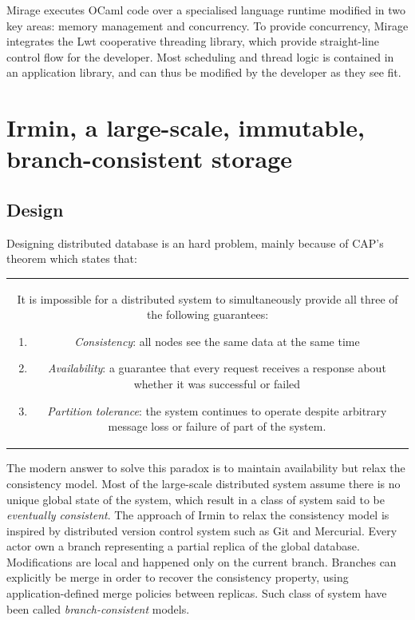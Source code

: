 \documentclass{article}
\renewcommand{\-}{\hyp}
\newcommand{\irmin}{Irmin\xspace}
\newcommand{\git}{Git\xspace}
\newcommand{\lwt}{Lwt\xspace}
\newcommand{\mercurial}{Mercurial\xspace}
\newcommand{\mirage}{Mirage\xspace}
\newcommand{\ocaml}{OCaml\xspace}
\begin{document}
\mirage executes \ocaml code over a specialised language runtime modified in two key areas: memory management and concurrency.
To provide concurrency, \mirage integrates the \lwt cooperative threading library, which provide straight-line control flow for the developer.
Most scheduling and thread logic is contained in an application library, and can thus be modified by the developer as they see fit\cite{LibraryOperatingSystemsCloud2013}.



\section{\irmin, a large-scale, immutable, branch-consistent storage}

\subsection{Design}

Designing distributed database is an hard problem, mainly because of CAP’s theorem\cite{BrewerConjecture2002} which states that:

\bigskip
\begin{tabular}{|c}
\begin{minipage}{0.9\textwidth}
It is impossible for a distributed system to simultaneously provide all three of the following guarantees:
\begin{enumerate}
	\item \emph{Consistency}: all nodes see the same data at the same time
	\item \emph{Availability}: a guarantee that every request receives a response about whether it was successful or failed
	\item \emph{Partition tolerance}: the system continues to operate despite arbitrary message loss or failure of part of the system.
\end{enumerate}
\end{minipage}
\end{tabular}
\bigskip

The modern answer to solve this paradox is to maintain availability but relax the consistency model.
Most of the large-scale distributed system assume there is no unique global state of the system, which result in a class of system said to be \emph{eventually consistent}\cite{EventuallyConsistentTransactions2012}.
The approach of \irmin to relax the consistency model is inspired by distributed version control system such as \git and \mercurial.
Every actor own a branch representing a partial replica of the global database.
Modifications are local and happened only on the current branch.
Branches can explicitly be merge in order to recover the consistency property, using application-defined merge policies between replicas.
Such class of system have been called \emph{branch-consistent} models.
\end{document}
